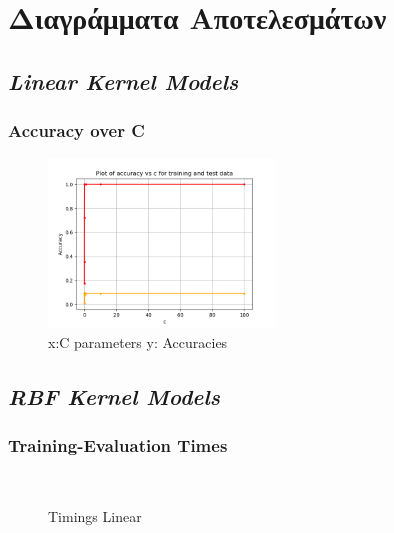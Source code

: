 \documentclass[10pt,a4paper,]{article}
\begin{document}
\section{Διαγράμματα Αποτελεσμάτων}
\subsection{\textit{Linear Kernel Models}}

\subsubsection{Accuracy over C}
\begin{figure}[!htb]
    \centering
    \includegraphics[width=6cm]{img/svm_3classclassifier.png}
    \caption{x:C parameters y: Accuracies}
    \label{fig:my_label}
\end{figure}
\subsection{\textit{RBF Kernel Models}}
\subsubsection{Training-Evaluation Times}
\begin{figure}[!htb]
\centering
    \hfill
    \\
    \caption{Timings Linear}
\end{figure}
\end{document}

